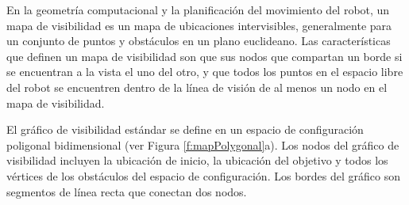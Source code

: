 
En la geometría computacional y la planificación del movimiento del 
robot, un mapa de visibilidad es un mapa de ubicaciones intervisibles, 
generalmente para un conjunto de puntos y obstáculos en un plano 
euclideano. Las características que definen 
un mapa de visibilidad son que sus nodos que compartan un borde si se encuentran 
a la vista el uno del otro, y que todos los puntos en el espacio libre del 
robot se encuentren dentro de la línea de visión de al menos un nodo 
en el mapa de visibilidad. 

El gráfico de visibilidad estándar se define en un espacio de 
configuración poligonal bidimensional (ver Figura \ref{f:mapPolygonal}a). Los 
nodos del gráfico de visibilidad incluyen la ubicación de inicio, la ubicación 
del objetivo y todos los vértices de los obstáculos del espacio de 
configuración. Los bordes del gráfico  son segmentos de línea recta que 
conectan dos nodos.


